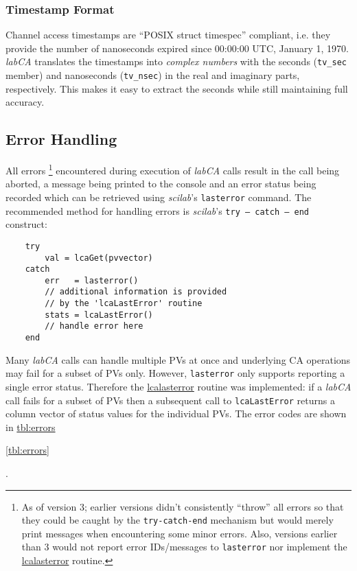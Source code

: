 \documentclass{article}
\newcommand{\sca}{\ita{labCA}}
\newcommand{\scilab}{\ita{scilab}}
\newcommand{\com}[1]{{\tt #1}}
\newcommand{\comref}[2]{\hyperref{\com{#1}}{\com{#1} (see }{)}{#2}}
\newcommand{\ita}[1]{\emph{#1}}
\begin{document}
\subsubsection{Timestamp Format}
\label{tsformat}
Channel access timestamps are ``POSIX struct timespec''
compliant, i.e. they provide the number of nanoseconds
expired since 00:00:00 UTC, January 1, 1970. \sca{} 
translates the timestamps into \ita{complex numbers}
with the seconds (\com{tv\_sec} member) and nanoseconds
(\com{tv\_nsec}) in the real and imaginary parts, respectively.
This makes it easy to extract the seconds while still maintaining
full accuracy.

\subsection{Error Handling}
\label{errorhandling}
All errors%
\footnote{As of version 3; earlier versions didn't consistently
``throw'' all errors so that they could be caught by the
\com{try-catch-end} mechanism but would merely print messages
when encountering some minor errors. Also, versions earlier than 3
would not report error IDs/messages to \com{lasterror} nor
implement the \comref{lcaLastError}{lcalasterror} routine.}
encountered during execution of \sca{} calls result in the
call being aborted, a message being printed to the console
and an error status being recorded which
can be retrieved using \scilab{}'s \com{lasterror} command.
The recommended method for handling errors is \scilab{}'s
\mbox{\com{try -- catch -- end}} construct:
\begin{verbatim}
	try
		val = lcaGet(pvvector)
	catch
		err   = lasterror()
		// additional information is provided
		// by the 'lcaLastError' routine
		stats = lcaLastError()
		// handle error here
	end
\end{verbatim}
Many \sca{} calls can handle multiple PVs at once
and underlying CA operations may fail for a subset of PVs only.
However, \com{lasterror} only supports reporting a single error
status. Therefore the \comref{lcaLastError}{lcalasterror} routine
was implemented: if a \sca{} call fails for a subset of PVs then
a subsequent call to \com{lcaLastError} returns a column vector
of status values for the individual PVs.
The error codes are shown in
\hyperref{Table~}{Table~}{}{tbl:errors}%
\begin{htmlonly}
\ref{tbl:errors}%
\end{htmlonly}
.
\end{document}
